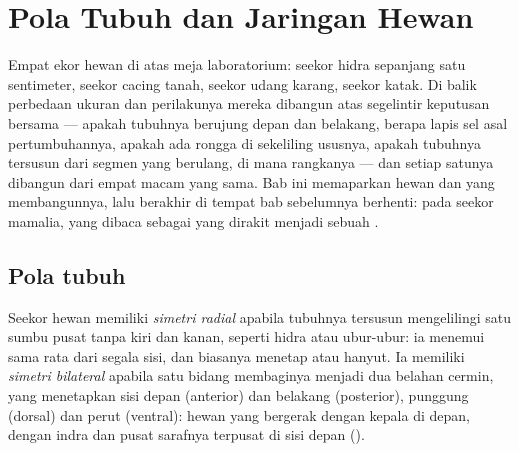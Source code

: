 \chapter{Pola Tubuh dan Jaringan Hewan}\label{ch:b1:body-plans-tissues}

Empat ekor hewan di atas meja laboratorium: seekor hidra sepanjang satu
sentimeter, seekor cacing tanah, seekor udang karang, seekor katak. Di
balik perbedaan ukuran dan perilakunya mereka dibangun atas segelintir
keputusan bersama --- apakah tubuhnya berujung depan dan belakang,
berapa lapis sel asal pertumbuhannya, apakah ada rongga di sekeliling
ususnya, apakah tubuhnya tersusun dari segmen yang berulang, di mana
rangkanya --- dan setiap satunya dibangun dari empat macam  yang
sama. Bab ini memaparkan  hewan dan  yang
membangunnya, lalu berakhir di tempat bab sebelumnya berhenti: pada
 seekor mamalia, yang dibaca sebagai  yang dirakit
menjadi sebuah .

\section{Pola tubuh}

\begin{definition}\label{def:b1:body-plans-tissues:symmetry}
Seekor hewan memiliki \emph{simetri radial}
apabila tubuhnya tersusun mengelilingi satu sumbu pusat tanpa kiri dan
kanan, seperti hidra atau ubur-ubur: ia menemui  sama rata
dari segala sisi, dan biasanya menetap atau hanyut. Ia memiliki
\emph{simetri bilateral} apabila satu bidang
membaginya menjadi dua belahan cermin, yang menetapkan sisi depan
(anterior) dan belakang (posterior), punggung (dorsal) dan perut
(ventral):  hewan yang bergerak dengan kepala di depan, dengan
indra dan pusat sarafnya terpusat di sisi depan ().
\end{definition}

